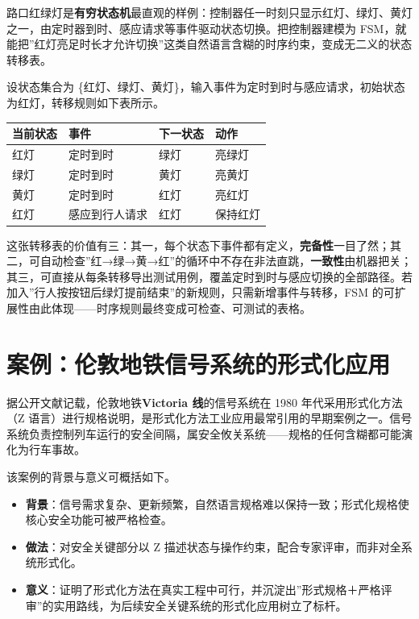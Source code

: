 \documentclass[12pt,a4paper,twoside,openany]{ctexbook}
\numberwithin{figure}{chapter}
\numberwithin{table}{chapter}
\providecommand{\tightlist}{\setlength{\itemsep}{0pt}\setlength{\parskip}{0pt}}
\newcounter{none}
\begin{document}
路口红绿灯是\textbf{有穷状态机}最直观的样例：控制器任一时刻只显示红灯、绿灯、黄灯之一，由定时器到时、感应请求等事件驱动状态切换。把控制器建模为
FSM，就能把''红灯亮足时长才允许切换''这类自然语言含糊的时序约束，变成无二义的状态转移表。

设状态集合为
\{红灯、绿灯、黄灯\}，输入事件为定时到时与感应请求，初始状态为红灯，转移规则如下表所示。

{\def\LTcaptype{none} %
\begin{longtable}[]{@{}llll@{}}
\toprule\noalign{}
当前状态 & 事件 & 下一状态 & 动作 \\
\midrule\noalign{}
\endhead
\bottomrule\noalign{}
\endlastfoot
红灯 & 定时到时 & 绿灯 & 亮绿灯 \\
绿灯 & 定时到时 & 黄灯 & 亮黄灯 \\
黄灯 & 定时到时 & 红灯 & 亮红灯 \\
红灯 & 感应到行人请求 & 红灯 & 保持红灯 \\
\end{longtable}
}

这张转移表的价值有三：其一，每个状态下事件都有定义，\textbf{完备性}一目了然；其二，可自动检查''红→绿→黄→红''的循环中不存在非法直跳，\textbf{一致性}由机器把关；其三，可直接从每条转移导出测试用例，覆盖定时到时与感应切换的全部路径。若加入''行人按按钮后绿灯提前结束''的新规则，只需新增事件与转移，FSM
的可扩展性由此体现------时序规则最终变成可检查、可测试的表格。

\section{案例：伦敦地铁信号系统的形式化应用}\label{ux6848ux4f8bux4f26ux6566ux5730ux94c1ux4fe1ux53f7ux7cfbux7edfux7684ux5f62ux5f0fux5316ux5e94ux7528}

据公开文献记载，伦敦地铁\textbf{Victoria 线}的信号系统在 1980
年代采用形式化方法（Z
语言）进行规格说明，是形式化方法工业应用最常引用的早期案例之一。信号系统负责控制列车运行的安全间隔，属安全攸关系统------规格的任何含糊都可能演化为行车事故。

该案例的背景与意义可概括如下。

\begin{itemize}
\tightlist
\item
  \textbf{背景}：信号需求复杂、更新频繁，自然语言规格难以保持一致；形式化规格使核心安全功能可被严格检查。
\item
  \textbf{做法}：对安全关键部分以 Z
  描述状态与操作约束，配合专家评审，而非对全系统形式化。
\item
  \textbf{意义}：证明了形式化方法在真实工程中可行，并沉淀出''形式规格＋严格评审''的实用路线，为后续安全关键系统的形式化应用树立了标杆。
\end{itemize}
\end{document}
